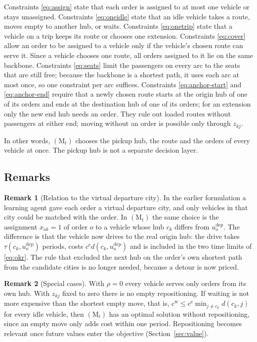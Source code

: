 \documentclass[12pt]{article}
\theoremstyle{plain}
\theoremstyle{definition}
\newtheorem{remark}{Remark}
\newcommand{\dep}{u^{\mathrm{dep}}}
\begin{document}
Constraints \eqref{eq:assign} state that each order is assigned to at most one vehicle or stays unassigned. Constraints \eqref{eq:oneidle} state that an idle vehicle takes a route, moves empty to another hub, or waits. Constraints \eqref{eq:onetrip} state that a vehicle on a trip keeps its route or chooses one extension. Constraints \eqref{eq:cover} allow an order to be assigned to a vehicle only if the vehicle's chosen route can serve it. Since a vehicle chooses one route, all orders assigned to it lie on the same backbone. Constraints \eqref{eq:seats} limit the passengers on every arc to the seats that are still free; because the backbone is a shortest path, it uses each arc at most once, so one constraint per arc suffices. Constraints \eqref{eq:anchor-start} and \eqref{eq:anchor-end} require that a newly chosen route starts at the origin hub of one of its orders and ends at the destination hub of one of its orders; for an extension only the new end hub needs an order. They rule out loaded routes without passengers at either end; moving without an order is possible only through $z_{kj}$.

In other words, $(\mathrm{M}_t)$ chooses the pickup hub, the route and the orders of every vehicle at once. The pickup hub is not a separate decision layer.

\subsection{Remarks}

\begin{remark}[Relation to the virtual departure city]
In the earlier formulation a learning agent gave each order a virtual departure city, and only vehicles in that city could be matched with the order. In $(\mathrm{M}_t)$ the same choice is the assignment $x_{ok}=1$ of order $o$ to a vehicle whose hub $c_k$ differs from $\dep_o$. The difference is that the vehicle now drives to the real origin hub: the drive takes $\tau(c_k,\dep_o)$ periods, costs $c^{\mathrm{e}}d(c_k,\dep_o)$ and is included in the two time limits of \eqref{eq:okr}. The rule that excluded the next hub on the order's own shortest path from the candidate cities is no longer needed, because a detour is now priced.
\end{remark}

\begin{remark}[Special cases]
With $\rho=0$ every vehicle serves only orders from its own hub. With $z_{kj}$ fixed to zero there is no empty repositioning. If waiting is not more expensive than the shortest empty move, that is, $c^{\mathrm{w}}\le c^{\mathrm{e}}\min_{j\neq c_k}d(c_k,j)$ for every idle vehicle, then $(\mathrm{M}_t)$ has an optimal solution without repositioning, since an empty move only adds cost within one period. Repositioning becomes relevant once future values enter the objective (Section~\ref{sec:value}).
\end{remark}
\end{document}
